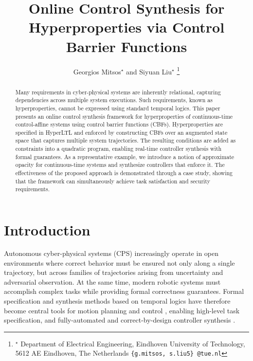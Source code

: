 \documentclass[letterpaper, 10 pt, conference]{ieeeconf}  %
\title{\LARGE \bf
Online Control Synthesis for Hyperproperties via Control Barrier Functions
}
\author{Georgios Mitsos$^{\star}$ and Siyuan Liu$^{\star}$%
\thanks{$^{\star}$ Department of Electrical Engineering, Eindhoven University of Technology, 5612 AE Eindhoven, The Netherlands {\tt\small \{g.mitsos, s.liu5\} @tue.nl}}%
}
\begin{document}
\maketitle
\thispagestyle{empty}
\pagestyle{empty}



\begin{abstract}
    Many requirements in cyber-physical systems are inherently relational, capturing dependencies across multiple system executions. Such requirements, known as hyperproperties, cannot be expressed using standard temporal logics. 
    This paper presents an online control synthesis framework for hyperproperties of continuous-time control-affine systems using control barrier functions (CBFs). Hyperproperties are specified in HyperLTL and enforced by constructing CBFs over an augmented state space that captures multiple system trajectories. The resulting conditions are added as constraints into a quadratic program, enabling real-time controller synthesis with formal guarantees. 
    As a representative example, we introduce a notion of approximate opacity for continuous-time systems and synthesize controllers that enforce it. The effectiveness of the proposed approach is demonstrated through a case study, showing that the framework can simultaneously achieve task satisfaction and security requirements.
\end{abstract}

\section{Introduction}

Autonomous cyber-physical systems (CPS) increasingly operate in open environments where correct behavior must be ensured not only along a single trajectory, but across families of trajectories arising from uncertainty and adversarial observation. At the same time, modern robotic systems must accomplish complex tasks while providing formal correctness guarantees. Formal specification and synthesis methods based on temporal logics have therefore become central tools for motion planning and control \cite{fainekos2009, kloetzer2008}, enabling high-level task specification, and fully-automated and correct-by-design controller synthesis \cite{smith2011}.
\end{document}
